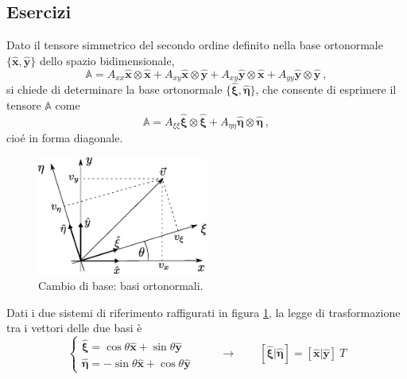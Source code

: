 \subsection{Esercizi}
\begin{exercise}
    Dato il tensore simmetrico del secondo ordine definito nella base ortonormale $\{\bm{\hat{x}}, \bm{\hat{y}}\}$ dello spazio bidimensionale,
\begin{equation}
    \mathbb{A} = A_{xx} \bm{\hat{x}} \otimes \bm{\hat{x}} +
                 A_{xy} \bm{\hat{x}} \otimes \bm{\hat{y}} +
                 A_{xy} \bm{\hat{y}} \otimes \bm{\hat{x}} +
                 A_{yy} \bm{\hat{y}} \otimes \bm{\hat{y}} \ ,
\end{equation}
 si chiede di determinare la base ortonormale $\{\bm{\hat{\xi}},\bm{\hat{\eta}}\}$, che consente di esprimere il tensore $\mathbb{A}$ come 
\begin{equation}
    \mathbb{A} = A_{\xi \xi } \bm{\hat{\xi }} \otimes \bm{\hat{\xi }} +
                 A_{\eta\eta} \bm{\hat{\eta}} \otimes \bm{\hat{\eta}} \ , 
\end{equation}
cioé in forma diagonale.
\end{exercise}
%
\begin{figure}[h]
 \centering
 \includegraphics[width=0.5\textwidth]{./fig/rotation}
    \caption{Cambio di base: basi ortonormali.}\label{fig:tensor:rotation}
\end{figure}
Dati i due sistemi di riferimento raffigurati in figura \ref{fig:tensor:rotation}, la legge di trasformazione tra i vettori delle due basi è
\begin{equation}
 \begin{cases}
   \bm{\hat{\xi}} =  \cos{\theta} \bm{\hat{x}} + \sin{\theta} \bm{\hat{y}} \\
   \bm{\hat{\eta}} = -\sin{\theta} \bm{\hat{x}} + \cos{\theta} \bm{\hat{y}} \
 \end{cases} \qquad \rightarrow \qquad
    [ \bm{\hat{\xi}} | \bm{\hat{\eta}} ] = [ \bm{\hat{x}} | \bm{\hat{y}} ] \ T
\end{equation}
